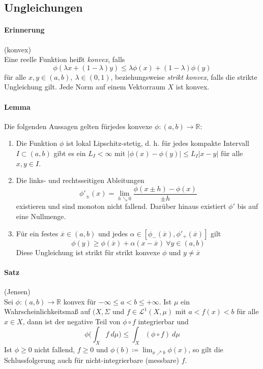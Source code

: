 \documentclass[12pt,a4paper,fleqn]{article}
\begin{document}
\subsection{Ungleichungen}

\paragraph{Erinnerung} (konvex)\\
Eine reelle Funktion heißt \textit{konvex}, falls
\begin{displaymath}
\phi(\lambda x + (1 - \lambda) y ) \leq \lambda \phi (x) + (1 - \lambda) \phi(y)
\end{displaymath}
für alle $x, y \in (a, b),\ \lambda \in (0,1)$, beziehungsweise \textit{strikt konvex}, falls die strikte Ungleichung gilt. Jede Norm auf einem Vektorraum $X$ ist konvex.

\paragraph{Lemma} Die folgenden Aussagen gelten fürjedes konvexe $\phi: (a, b) \rightarrow \mathbb{R}$:
\begin{enumerate}
\item Die Funktion $\phi$ ist lokal Lipschitz-stetig, d. h. für jedes kompakte Intervall $I \subset (a, b)$ gibt es ein $L_I < \infty$ mit $\vert \phi(x) - \phi(y) \vert \leq L_I \vert x - y \vert$ für alle $x, y \in I$.
\item Die links- und rechtsseitigen Ableitungen
\begin{displaymath}
\phi'_{\pm}(x) = \lim_{h \searrow 0} \frac{\phi (x \pm h) - \phi (x)}{\pm h}
\end{displaymath}
existieren und sind monoton nicht fallend. Darüber hinaus existiert $\phi'$ bis auf eine Nullmenge.
\item Für ein festes $\overline{x} \in (a, b)$ und jedes $\alpha \in [\phi_-(\overline{x}), \phi'_+(\overline{x})]$ gilt
\begin{displaymath}
\phi (y) \geq \phi(\overline{x}) + \alpha(x - \overline{x})\ \forall y \in (a, b)
\end{displaymath}
Diese Ungleichung ist strikt für strikt konvexe $\phi$ und $y \not = \overline{x}$
\end{enumerate}

\paragraph{Satz} (Jensen)\\
Sei $\phi: (a, b) \rightarrow \mathbb{R}$ konvex für $-\infty \leq a < b \leq +\infty$. Ist $\mu$ ein Wahrscheinlichkeitsmaß auf $(X, \Sigma$ und $f \in \mathscr{L}^1(X, \mu)$ mit $a < f(x) < b$ für alle $x \in X$, dann ist der negative Teil von $\phi \circ f$ integrierbar und
\begin{displaymath}
\phi \bigg(\int_X f\ d\mu \bigg) \leq \int_X (\phi \circ f)\ d\mu 
\end{displaymath}
Ist $\phi \geq 0$ nicht fallend, $f \geq 0$ und $\phi(b) \coloneqq \lim_{x \nearrow b} \phi(x)$, so gilt die Schlussfolgerung auch für nicht-integrierbare (messbare) $f$.
\end{document}
